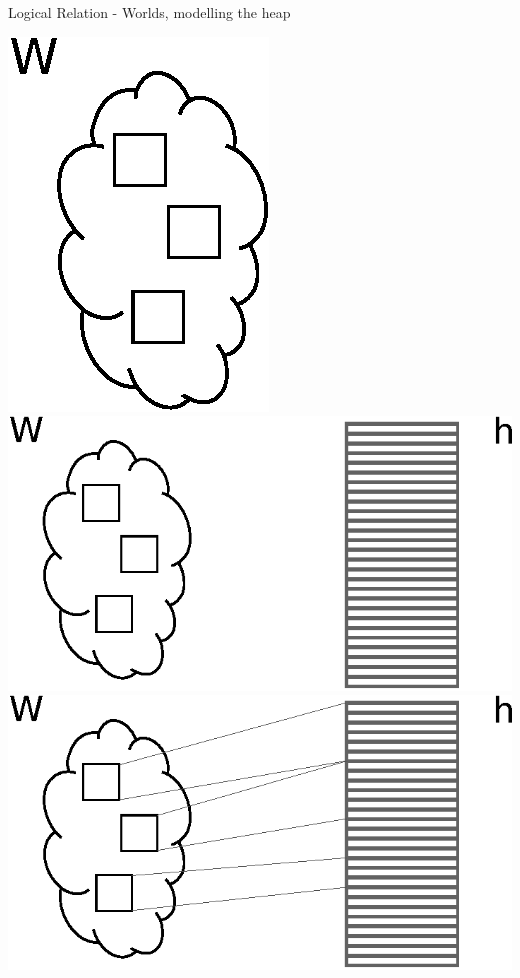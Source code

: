 \documentclass{beamer}
\begin{document}
\begin{frame}{Logical Relation - Worlds, modelling the heap}
\begin{overlayarea}{\textwidth}{3cm}
\end{overlayarea}
\begin{overprint}
  \includegraphics{world1.eps}
  \includegraphics{world2.eps}
  \includegraphics{world3.eps}

\end{overprint}
\end{frame}
\end{document}
